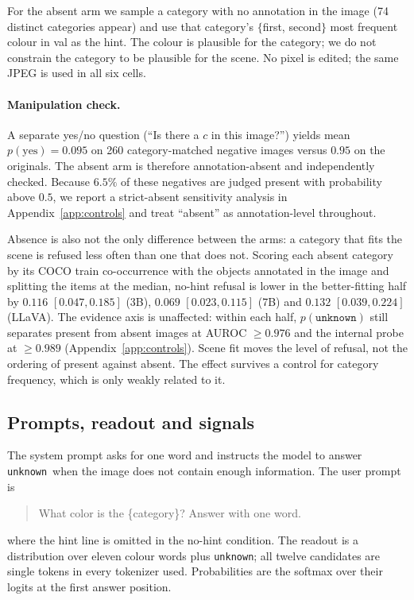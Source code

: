 \documentclass[10pt]{article}
\newcommand{\unknown}{\texttt{unknown}}
\newcommand{\punk}{p(\unknown)}
\begin{document}
For the absent arm we sample a category with no annotation in the image (74 distinct categories appear) and use that category's $\{$first, second$\}$ most frequent colour in val as the hint. The colour is plausible for the category; we do not constrain the category to be plausible for the scene. No pixel is edited; the same JPEG is used in all six cells.

\paragraph{Manipulation check.}
A separate yes/no question (``Is there a $c$ in this image?'') yields mean $p(\text{yes})=0.095$ on 260 category-matched negative images versus $0.95$ on the originals. The absent arm is therefore annotation-absent and independently checked. Because $6.5\%$ of these negatives are judged present with probability above $0.5$, we report a strict-absent sensitivity analysis in Appendix~\ref{app:controls} and treat ``absent'' as annotation-level throughout.

Absence is also not the only difference between the arms: a category that fits the scene is refused less often than one that does not. Scoring each absent category by its COCO train co-occurrence with the objects annotated in the image and splitting the items at the median, no-hint refusal is lower in the better-fitting half by $0.116$ $[0.047,0.185]$ (3B), $0.069$ $[0.023,0.115]$ (7B) and $0.132$ $[0.039,0.224]$ (LLaVA). The evidence axis is unaffected: within each half, $\punk$ still separates present from absent images at AUROC $\ge0.976$ and the internal probe at $\ge0.989$ (Appendix~\ref{app:controls}). Scene fit moves the level of refusal, not the ordering of present against absent. The effect survives a control for category frequency, which is only weakly related to it.

\subsection{Prompts, readout and signals}

The system prompt asks for one word and instructs the model to answer \unknown\ when the image does not contain enough information. The user prompt is
\begin{quote}\small{}\newline
What color is the \{category\}?\newline
Answer with one word.
\end{quote}
where the hint line is omitted in the no-hint condition. The readout is a distribution over eleven colour words plus \unknown; all twelve candidates are single tokens in every tokenizer used. Probabilities are the softmax over their logits at the first answer position.
\end{document}
